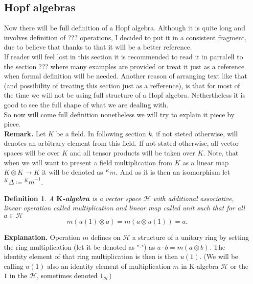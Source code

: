 \documentclass[a4paper]{article}
\newtheorem{definition}{Definition}
\begin{document}
\subsection{Hopf algebras}
Now there will be full definition of a Hopf algebra. Although it is quite long and involves
definition of ??? operations, I decided to put it in a consistent fragment, due to believe
that thanks to that it will be a better reference. \\
If reader will feel lost in this section it is recommended to read it in parralell to the section ???
where many examples are provided or treat it just as a reference  when formal definition will be needed.
Another reason of arranging text like that (and possibility of treating this section just as a refference),
is that for most of the time we will not be using full structure of a Hopf algebra. Nethertheless it is good
to see the full shape of what we are dealing with. \\
So now will come full definition nonetheless we will try to explain it piece by piece. \\[8pt]
\textbf{Remark. }Let $K$ be a field. In following section $k$, if not steted otherwise, will
denotes an arbitrary element from this field. If not stated otherwise, all vector spaces will be over $K$ and
all tensor products will be taken over $K$. Note, that when we will want to present a field multiplication 
from $K$ as a linear map $K \otimes K \to K$ it will be denoted as ${^Km}$. And as it is then an isomorphism 
let ${^K\Delta} \coloneqq {^Km}^{-1}$.
\begin{definition}
A \textbf{$\textbf{K}$-algebra} is a vector space $\mathcal{H}$ with additional 
associative, linear operation
 called multiplication and linear map
 called unit such that for all $a \in \mathcal{H}$
\begin{equation*}
m(u(1) \otimes a) = m(a \otimes u(1)) = a.
\end{equation*}
\end{definition}
\textbf{Explanation. } Operation $m$ defines on $\mathcal{H}$ a structure of a unitary ring by setting the
ring multiplication (let it be denoted as "$\cdot$") as $a \cdot b = m(a \otimes b)$. The identity element of
that ring multiplication is then is then $u(1)$. (We will be calling $u(1)$ also an identity element of
multiplication $m$ in K-algebra $\mathcal{H}$ or the $1$ in the $\mathcal{H}$,
sometimes denoted $1_\mathcal{H}$)\\
\end{document}
